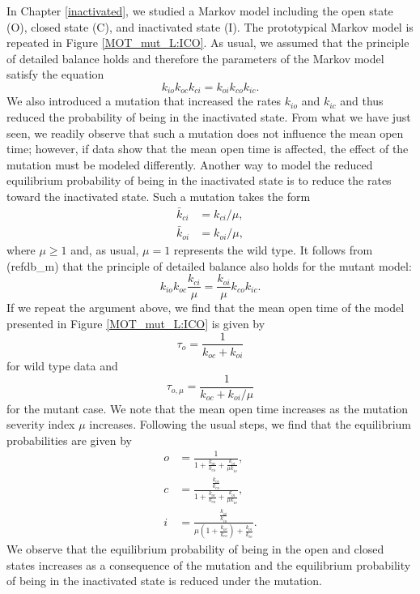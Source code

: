 In Chapter \ref{inactivated}, we studied a Markov model including the
open state (O), closed state (C), and inactivated state (I). The prototypical 
Markov model is repeated in Figure \ref{MOT_mut_L:ICO}.
 As usual, we assumed that the principle of detailed balance holds and
therefore the parameters of the Markov model satisfy the equation
\begin{equation}
k_{io}k_{oc}k_{ci}=k_{oi}k_{co}k_{ic}.\label{db_m}
\end{equation}
We also introduced a mutation that increased the rates $k_{io}$ and $k_{ic}$ and thus
reduced the probability of being in the inactivated state. From what we have
just seen, we readily observe that such a mutation does not influence the mean
open time; however, if data show that the mean open time is affected, the effect of
the mutation must be modeled differently. Another way to model the reduced
equilibrium probability of being in the inactivated state is to reduce the
rates toward the inactivated state. Such a mutation takes the form
\begin{align}
\bar{k}_{ci} &  =k_{ci}/\mu,\label{ratesvm_m}\\
\bar{k}_{oi} &  =k_{oi}/\mu, \nonumber
\end{align}
where $\mu\geqslant1$ and, as usual, $\mu=1$ represents the wild type. It
follows from (ref{db_m}) that the principle of detailed
balance also holds for the mutant model:
\begin{equation}
k_{io}k_{oc}\frac{k_{ci}}{\mu}=\frac{k_{oi}}{\mu}k_{co}k_{ic}.\label{db_mm}
\end{equation}
If we repeat the argument above, we find that the mean open time of the model
presented in Figure \ref{MOT_mut_L:ICO} is given by
\[
\tau_{o}=\frac{1}{k_{oc}+k_{oi}}%
\]
for wild type data and
\[
\tau_{o,\mu}=\frac{1}{k_{oc}+k_{oi}/\mu}
\]
for the mutant case. We note that the mean open time increases as the mutation severity
index $\mu$ increases. Following the usual steps, we find that the equilibrium
probabilities are given by
\begin{align*}
o &  =\frac{1}{1+\frac{k_{oc}}{k_{co}}+\frac{k_{oi}}{\mu k_{io}}},\\
c &  =\frac{\frac{k_{oc}}{k_{co}}}{1+\frac{k_{oc}}{k_{co}}+\frac{k_{oi}}{\mu
k_{io}}},\\
i &  =\frac{\frac{k_{oi}}{k_{io}}}{\mu\left(  1+\frac{k_{oc}}{k_{co}}\right)
+\frac{k_{oi}}{k_{io}}}.
\end{align*}
We observe that the equilibrium probability of being in the open and closed states
increases as a consequence of the mutation and the equilibrium probability of
being in the inactivated state is reduced under the mutation.

